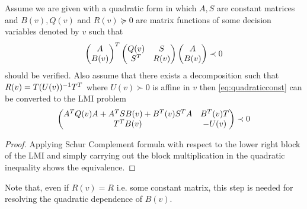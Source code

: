 \begin{lem}\label{lem:linlemma} Assume we are given with a quadratic form in which $A,S$ are constant matrices and $B(v),Q(v)$ and $R(v)\succeq 0$ are matrix functions 
of some decision variables denoted by $v$ such that
\begin{equation}
\begin{pmatrix}A\\B(v)\end{pmatrix}^T\begin{pmatrix}Q(v) &S\\S^T &R(v)\end{pmatrix}\begin{pmatrix}A\\B(v)\end{pmatrix} \prec 0
\label{eq:quadraticconst}
\end{equation}
should be verified. Also assume that there exists a decomposition such that $R(v) = T(U(v))^{-1}T^T$ where $U(v)\succ 0 $ is affine in $v$ then 
\eqref{eq:quadraticconst} can be converted to the LMI problem
\begin{equation}
\begin{pmatrix}A^TQ(v)A + A^TSB(v) + B^T(v)S^TA &B^T(v)T\\T^TB(v) &-U(v)\end{pmatrix}\prec 0
\label{eq:linearizedconst}
\end{equation}
\end{lem}

\begin{proof} Applying Schur Complement formula with respect to the lower right block of the LMI and simply carrying out the block
multiplication in the quadratic inequality shows the equivalence. 
\end{proof}
Note that, even if $R(v)=R$ i.e. some constant matrix, this step is needed for resolving the quadratic dependence of $B(v)$. 

